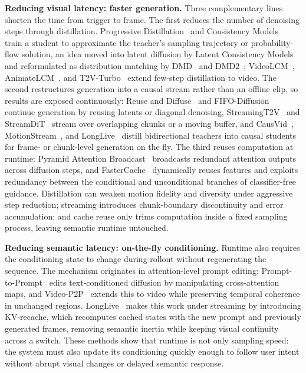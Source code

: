\textbf{Reducing visual latency: faster generation.}
Three complementary lines shorten the time from trigger to frame.
The first reduces the number of denoising steps through distillation.
Progressive Distillation~\cite{salimans2022progressive} and Consistency Models~\cite{song2023consistency} train a student to approximate the teacher's sampling trajectory or probability-flow solution, an idea moved into latent diffusion by Latent Consistency Models~\cite{luo2023lcm} and reformulated as distribution matching by DMD~\cite{yin2024dmd} and DMD2~\cite{yin2024dmd2}; VideoLCM~\cite{wang2023videolcm}, AnimateLCM~\cite{wang2024animatelcm}, and T2V-Turbo~\cite{li2024t2vturbo} extend few-step distillation to video.
The second restructures generation into a causal stream rather than an offline clip, so results are exposed continuously: Reuse and Diffuse~\cite{gu2023reusediffuse} and FIFO-Diffusion~\cite{kim2024fifodiffusion} continue generation by reusing latents or diagonal denoising, StreamingT2V~\cite{henschel2024streamingt2v} and StreamDiT~\cite{kodaira2025streamdit} stream over overlapping chunks or a moving buffer, and CausVid~\cite{yin2025causvid}, MotionStream~\cite{shin2025motionstream}, and LongLive~\cite{yang2025longlive} distill bidirectional teachers into causal students for frame- or chunk-level generation on the fly.
The third reuses computation at runtime: Pyramid Attention Broadcast~\cite{zhao2024pab} broadcasts redundant attention outputs across diffusion steps, and FasterCache~\cite{lv2024fastercache} dynamically reuses features and exploits redundancy between the conditional and unconditional branches of classifier-free guidance.
Distillation can weaken motion fidelity and diversity under aggressive step reduction; streaming introduces chunk-boundary discontinuity and error accumulation; and cache reuse only trims computation inside a fixed sampling process, leaving semantic runtime untouched.

\textbf{Reducing semantic latency: on-the-fly conditioning.}
Runtime also requires the conditioning state to change during rollout without regenerating the sequence.
The mechanism originates in attention-level prompt editing: Prompt-to-Prompt~\cite{hertz2022prompt2prompt} edits text-conditioned diffusion by manipulating cross-attention maps, and Video-P2P~\cite{liu2024videop2p} extends this to video while preserving temporal coherence in unchanged regions.
LongLive~\cite{yang2025longlive} makes this work under streaming by introducing KV-recache, which recomputes cached states with the new prompt and previously generated frames, removing semantic inertia while keeping visual continuity across a switch.
These methods show that runtime is not only sampling speed: the system must also update its conditioning quickly enough to follow user intent without abrupt visual changes or delayed semantic response.

